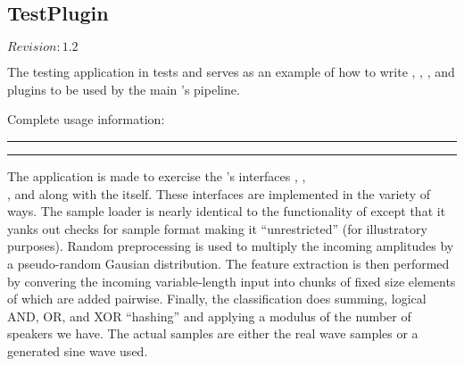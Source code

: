 \subsection{TestPlugin}

$Revision: 1.2 $

The  testing application in {\marf}
tests and serves as an example of how to write
, , , and
 plugins to be used by the main
's pipeline.

\noindent
Complete usage information:

\vspace{15pt}
\hrule

\hrule
\vspace{15pt}

The application is made to exercise the {\marf}'s
interfaces , , \\, and
 along with the  itself. These interfaces
are implemented in the variety of ways. The sample loader is nearly identical
to the functionality of  except that it yanks out checks
for sample format making it ``unrestricted'' (for illustratory purposes).
Random preprocessing is used to multiply the incoming amplitudes by
a pseudo-random Gausian distribution. The feature extraction is then
performed by convering the incoming variable-length input into chunks of
fixed size elements of which are added pairwise. Finally, the classification
does summing, logical AND, OR, and XOR ``hashing'' and applying a modulus
of the number of speakers we have. The actual samples are either the real
wave samples or a generated sine wave used.

